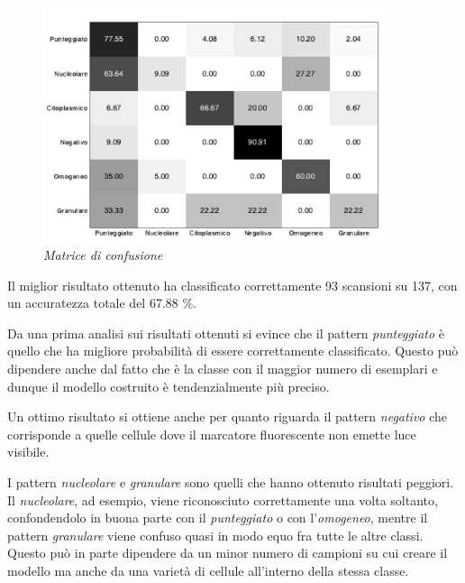 \begin{figure}[H] 
  \centering
    \includegraphics[width=0.9\textwidth]{images/confusion_matrix.png}
    \caption{{\small \textit{Matrice di confusione}}}
\end{figure}

Il miglior risultato ottenuto ha classificato correttamente 93 scansioni su 137, con un accuratezza totale del 67.88 \%.

Da una prima analisi sui risultati ottenuti si evince che il pattern \emph{punteggiato} è quello che ha migliore probabilità di essere correttamente classificato. Questo può dipendere anche dal fatto che è la classe con il maggior numero di esemplari e dunque il modello costruito è tendenzialmente più preciso.

Un ottimo risultato si ottiene anche per quanto riguarda il pattern \emph{negativo} che corrisponde a quelle cellule dove il marcatore fluorescente non emette luce visibile. 

I pattern \emph{nucleolare} e \emph{granulare} sono quelli che hanno ottenuto risultati peggiori. Il \emph{nucleolare}, ad esempio, viene riconosciuto correttamente una volta soltanto, confondendolo
in buona parte con il \emph{punteggiato} o con l'\emph{omogeneo}, mentre il pattern \emph{granulare} viene confuso quasi in modo equo fra tutte le altre classi. Questo può in parte dipendere da un minor numero di campioni su cui creare il modello ma anche da una varietà di cellule all'interno della stessa classe.